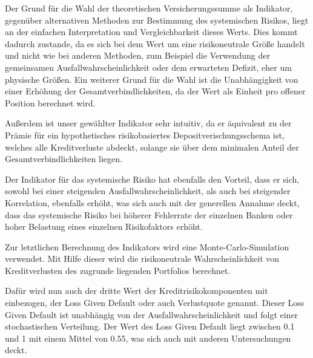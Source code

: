 \documentclass[a4paper,12pt]{scrartcl}
\begin{document}
Der Grund für die Wahl der theoretischen Versicherungssumme als Indikator, gegenüber alternativen Methoden zur Bestimmung des systemischen Risikos, liegt an der einfachen Interpretation und Vergleichbarkeit dieses Werts. Dies kommt dadurch zustande, da es sich bei dem Wert um eine risikoneutrale Größe handelt und nicht wie bei anderen Methoden, zum Beispiel die Verwendung der gemeinsamen Ausfallwahrscheinlichkeit oder dem erwarteten Defizit, eher um physische Größen.  
Ein weiterer Grund für die Wahl ist  die Unabhängigkeit von einer Erhöhung der Gesamtverbindlichkeiten, da der Wert als Einheit pro offener Position berechnet wird.

Außerdem ist unser gewählter Indikator sehr intuitiv, da er äquivalent zu der Prämie für ein hypothetisches risikobasiertes Depositverischungsschema ist, welches alle Kreditverluste abdeckt, solange sie über dem minimalen Anteil der Gesamtverbindlichkeiten liegen.

Der Indikator für das systemische Risiko hat ebenfalls den Vorteil, dass er sich, sowohl bei einer steigenden Ausfallwahrscheinlichkeit, als auch bei steigender Korrelation, ebenfalls erhöht, was sich auch mit der generellen Annahme deckt, dass das systemische Risiko  bei höherer Fehlerrate der einzelnen Banken oder hoher Belastung eines einzelnen Risikofaktors erhöht.

Zur letztlichen Berechnung des Indikators wird eine Monte-Carlo-Simulation verwendet. Mit Hilfe dieser wird die risikoneutrale Wahrscheinlichkeit von Kreditverlusten des zugrunde liegenden Portfolios berechnet. 

Dafür wird nun auch der dritte Wert der Kreditrisikokomponenten mit einbezogen, der Loss Given Default oder auch Verlustquote genannt. Dieser Loss Given Default ist unabhängig von der Ausfallwahrscheinlichkeit und folgt einer stochastischen Verteilung. Der Wert des Loss Given Default liegt zwischen 0.1 und 1 mit einem Mittel von 0.55, was sich auch mit anderen Untersuchungen deckt.
\end{document}
